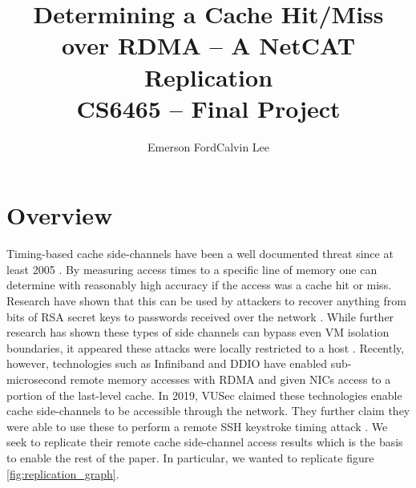 \documentclass[twocolumn]{article}
\title{\Large\textbf{Determining a Cache Hit/Miss over RDMA -- A NetCAT Replication} \\
CS6465 -- Final Project}
\author{Emerson Ford\hspace{20pt}Calvin Lee}
\date{}
\begin{document}
\maketitle
\section{Overview}
Timing-based cache side-channels have been a well documented threat since at least 2005 \cite{osvik2006cache}.
By measuring access times to a specific line of memory one can determine with reasonably high accuracy if the access was a cache hit or miss.
Research have shown that this can be used by attackers to recover anything from bits of RSA secret keys to passwords received over the network \cite{schwarz2018keydrown} \cite{yarom2014flush+}.
While further research has shown these types of side channels can bypass even VM isolation boundaries, it appeared these attacks were locally restricted to a host \cite{liu2015last}.
Recently, however, technologies such as Infiniband and DDIO have enabled sub-microsecond remote memory accesses with RDMA and given NICs access to a portion of the last-level cache.
In 2019, VUSec claimed these technologies enable cache side-channels to be accessible through the network. They further claim they were able to use these to perform a remote SSH keystroke timing attack \cite{kurth_netcat:_2020}. We seek to replicate their remote cache side-channel access results which is the basis to enable the rest of the paper. In particular, we wanted to replicate figure \ref{fig:replication_graph}.


%
\end{document}
